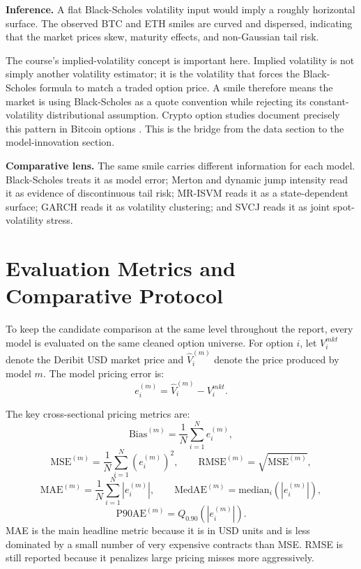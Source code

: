 \documentclass[11pt]{article}
\begin{document}
\textbf{Inference.} A flat Black-Scholes volatility input would imply a roughly horizontal surface. The observed BTC and ETH smiles are curved and dispersed, indicating that the market prices skew, maturity effects, and non-Gaussian tail risk.

The course's implied-volatility concept is important here. Implied volatility is not simply another volatility estimator; it is the volatility that forces the Black-Scholes formula to match a traded option price. A smile therefore means the market is using Black-Scholes as a quote convention while rejecting its constant-volatility distributional assumption. Crypto option studies document precisely this pattern in Bitcoin options \cite{zulfiqar2021iv,chenyang2024}. This is the bridge from the data section to the model-innovation section.

\textbf{Comparative lens.} The same smile carries different information for each model. Black-Scholes treats it as model error; Merton and dynamic jump intensity read it as evidence of discontinuous tail risk; MR-ISVM reads it as a state-dependent surface; GARCH reads it as volatility clustering; and SVCJ reads it as joint spot-volatility stress.

\section{Evaluation Metrics and Comparative Protocol}

To keep the candidate comparison at the same level throughout the report, every model is evaluated on the same cleaned option universe. For option $i$, let $V_i^{mkt}$ denote the Deribit USD market price and $\widehat{V}_{i}^{(m)}$ denote the price produced by model $m$. The model pricing error is:
\[
e_i^{(m)}=\widehat{V}_{i}^{(m)}-V_i^{mkt}.
\]

The key cross-sectional pricing metrics are:
\[
\mathrm{Bias}^{(m)}=\frac{1}{N}\sum_{i=1}^{N}e_i^{(m)},
\]
\[
\mathrm{MSE}^{(m)}=\frac{1}{N}\sum_{i=1}^{N}\left(e_i^{(m)}\right)^2,
\qquad
\mathrm{RMSE}^{(m)}=\sqrt{\mathrm{MSE}^{(m)}},
\]
\[
\mathrm{MAE}^{(m)}=\frac{1}{N}\sum_{i=1}^{N}\left|e_i^{(m)}\right|,
\qquad
\mathrm{MedAE}^{(m)}=\mathrm{median}_{i}\left(\left|e_i^{(m)}\right|\right),
\]
\[
\mathrm{P90AE}^{(m)}=Q_{0.90}\left(\left|e_i^{(m)}\right|\right).
\]
MAE is the main headline metric because it is in USD units and is less dominated by a small number of very expensive contracts than MSE. RMSE is still reported because it penalizes large pricing misses more aggressively.
\end{document}
